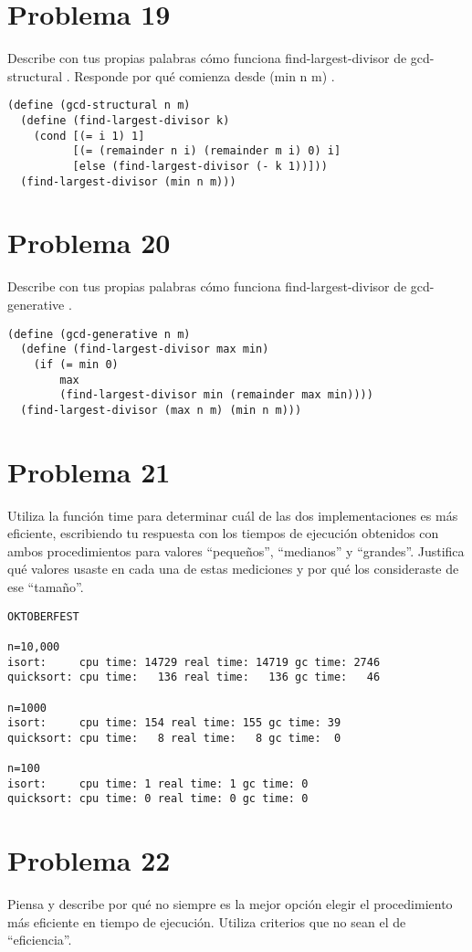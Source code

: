 \documentclass[a4paper,11pt]{article}
\theoremstyle{mytheor}
\begin{document}
\section*{Problema 19}
Describe con tus propias palabras cómo funciona find-largest-divisor de gcd-structural . Responde por qué comienza desde (min n m) .

\begin{lstlisting}[title = gcd-structural]
(define (gcd-structural n m)
  (define (find-largest-divisor k)
    (cond [(= i 1) 1]
          [(= (remainder n i) (remainder m i) 0) i]
          [else (find-largest-divisor (- k 1))]))
  (find-largest-divisor (min n m)))
\end{lstlisting}

\section*{Problema 20}
Describe con tus propias palabras cómo funciona find-largest-divisor de gcd-
generative .

\begin{lstlisting}[title = gcd-generative]
(define (gcd-generative n m)
  (define (find-largest-divisor max min)
    (if (= min 0)
        max
        (find-largest-divisor min (remainder max min))))
  (find-largest-divisor (max n m) (min n m)))
\end{lstlisting}



\section*{Problema 21}
Utiliza la función time para determinar cuál de las dos implementaciones es más
eficiente, escribiendo tu respuesta con los tiempos de ejecución obtenidos con ambos procedimientos
para valores “pequeños”, “medianos” y “grandes”. Justifica qué valores usaste en cada una de estas
mediciones y por qué los consideraste de ese “tamaño”.
\begin{lstlisting}[title= timing quicksort and isort]
OKTOBERFEST

n=10,000
isort:     cpu time: 14729 real time: 14719 gc time: 2746
quicksort: cpu time:   136 real time:   136 gc time:   46

n=1000
isort:     cpu time: 154 real time: 155 gc time: 39
quicksort: cpu time:   8 real time:   8 gc time:  0

n=100
isort:     cpu time: 1 real time: 1 gc time: 0
quicksort: cpu time: 0 real time: 0 gc time: 0

\end{lstlisting}

\section*{Problema 22}
Piensa y describe por qué no siempre es la mejor opción elegir el procedimiento más
eficiente en tiempo de ejecución. Utiliza criterios que no sean el de “eficiencia”.
\end{document}

